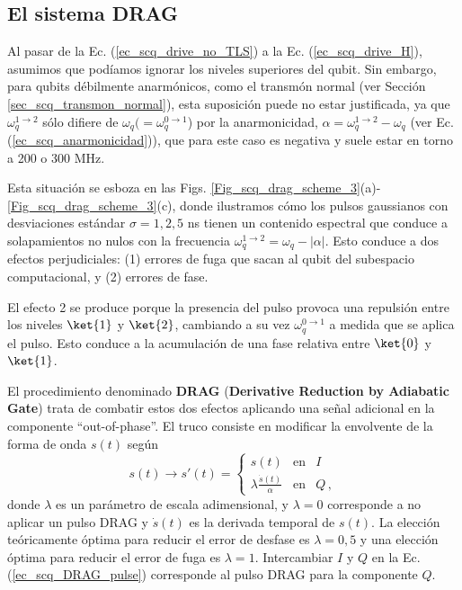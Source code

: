     

    \subsection{El sistema DRAG}

    Al pasar de la Ec. (\ref{ec_scq_drive_no_TLS}) a la Ec. (\ref{ec_scq_drive_H}), asumimos que podíamos ignorar los niveles superiores del qubit. Sin embargo, para qubits débilmente anarmónicos, como el transmón normal (ver Sección \ref{sec_scq_transmon_normal}), esta suposición puede no estar justificada, ya que $\omega_q^{1 \rightarrow 2}$ sólo difiere de $\omega_q (=\omega_q^{0 \rightarrow 1}$) por la anarmonicidad, $\alpha = \omega_q^{1 \rightarrow 2} - \omega_q$ (ver Ec. (\ref{ec_scq_anarmonicidad})), que para este caso es negativa y suele estar en torno a 200 o 300 MHz. 
    
    Esta situación se esboza en las Figs. \ref{Fig_scq_drag_scheme_3}(a)-\ref{Fig_scq_drag_scheme_3}(c), donde ilustramos cómo los pulsos gaussianos con desviaciones estándar $\sigma = {1,2,5}$ ns tienen un contenido espectral que conduce a solapamientos no nulos con la frecuencia $\omega_q^{1 \rightarrow 2} = \omega_q - |\alpha|$. Esto conduce a dos efectos perjudiciales: (1) errores de fuga que sacan al qubit del subespacio computacional, y (2) errores de fase. 

    
    El efecto 2 se produce porque la presencia del pulso provoca una repulsión entre los niveles $\ket{1}$ y $\ket{2}$, cambiando a su vez $\omega_q^{0 \rightarrow 1}$ a medida que se aplica el pulso. Esto conduce a la acumulación de una fase relativa entre $\ket{0}$ y $\ket{1}$. 
    
    El procedimiento denominado \textbf{DRAG} (\textbf{Derivative Reduction by Adiabatic Gate}) trata de combatir estos dos efectos aplicando una señal adicional en la componente ``out-of-phase''. El truco consiste en modificar la envolvente de la forma de onda $s(t)$ según
    \begin{equation} \label{ec_scq_DRAG_pulse}
        s(t) \rightarrow s'(t) = 
        \left\{  
            \begin{matrix}
                s(t) & \text{en} & I \\
                \lambda \frac{\dot{s}(t)}{\alpha} & \text{en} & Q\,,
            \end{matrix} 
        \right.
    \end{equation}
    donde $\lambda$ es un parámetro de escala adimensional, y $\lambda = 0$ corresponde a no aplicar un pulso DRAG y $\dot{s}(t)$ es la derivada temporal de $s(t)$. La elección teóricamente óptima para reducir el error de desfase es $\lambda = 0,5$ y una elección óptima para reducir el error de fuga es $\lambda = 1$. Intercambiar $I$ y $Q$ en la Ec. (\ref{ec_scq_DRAG_pulse}) corresponde al pulso DRAG para la componente $Q$.

